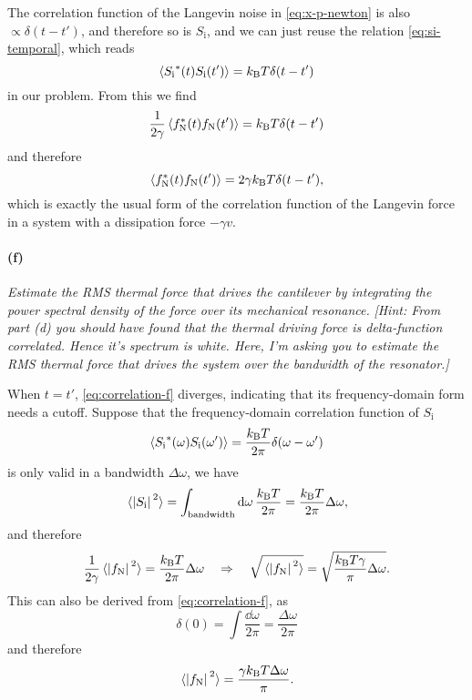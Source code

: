 \documentclass[hyperref, a4paper]{article}
\newcommand*{\kB}{k_{\text{B}}}
\newcommand*{\Si}{{S_{\text{i}}}}
\newcommand*{\fn}{f_{\text{N}}}
\begin{document}
The correlation function of the Langevin noise in \eqref{eq:x-p-newton} is also $\propto \delta(t-t')$,
and therefore so is $\Si$,
and we can just reuse the relation \eqref{eq:si-temporal}, which reads
\begin{equation}
    \expval{\Si^*(t) \Si(t')} = \kB T \delta(t - t')
\end{equation} 
in our problem. From this we find 
\[
    \frac{1}{2 \gamma} \expval{\fn^*(t) \fn(t')} = \kB T \delta(t - t')
\]  
and therefore
\begin{equation}
    \expval{\fn^*(t) \fn(t')} = 2 \gamma \kB T \delta(t - t'),
    \label{eq:correlation-f}
\end{equation}
which is exactly the usual form of the correlation function of the Langevin force 
in a system with a dissipation force $- \gamma v$.

\paragraph*{(f)} \textit{Estimate the RMS thermal force that drives the cantilever by integrating the power spectral density of the force over its mechanical resonance.} 
\textit{[Hint: From part (d) you should have found that the thermal driving force is delta-function correlated. Hence it's spectrum is white. Here, I'm asking you to estimate the RMS thermal force that drives the system over the bandwidth of the resonator.]}

When $t = t'$, \eqref{eq:correlation-f} diverges, indicating that its frequency-domain form needs a cutoff.
Suppose that the frequency-domain correlation function of $\Si$ 
\begin{equation}
    \expval{\Si^*(\omega) \Si(\omega')} = \frac{\kB T}{2\pi} \delta(\omega - \omega')
\end{equation}
is only valid in a bandwidth $\Delta \omega$, we have  
\begin{equation}
    \expval*{\abs*{\Si}^2} = \int_{\text{bandwidth}} \dd{\omega} \frac{\kB T}{2\pi} 
    = \frac{\kB T}{2\pi} \Delta \omega,
\end{equation}
and therefore 
\begin{equation}
    \frac{1}{2\gamma} \expval*{\abs*{\fn}^2} = \frac{\kB T}{2\pi} \Delta \omega
    \quad \Rightarrow \quad
    \sqrt{\expval*{\abs*{\fn}^2}} = \sqrt{\frac{\kB T \gamma}{\pi} \Delta \omega}.
\end{equation}
This can also be derived from \eqref{eq:correlation-f}, as 
\[
    \delta(0) = \int \frac{\dd{\omega}}{2\pi} = \frac{\Delta \omega}{2\pi}
\]
and therefore 
\begin{equation}
    \expval*{\abs*{\fn}^2} = \frac{\gamma \kB T \Delta \omega}{\pi}.
\end{equation}
\end{document}
